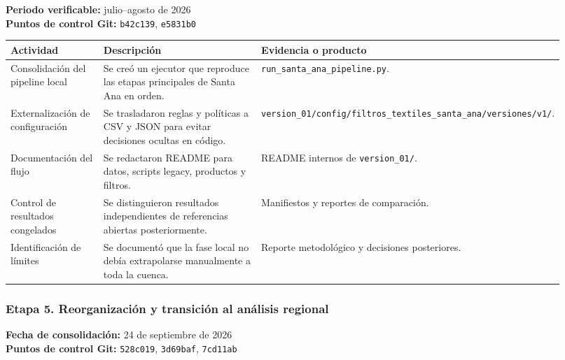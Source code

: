\documentclass[
  spanish,
]{article}
\newcounter{none} %
\begin{document}
\textbf{Periodo verificable:} julio--agosto de 2026\\
\textbf{Puntos de control Git:} \texttt{b42c139}, \texttt{e5831b0}

{\def\LTcaptype{none} %
\begin{longtable}[]{@{}p{0.20\linewidth}p{0.44\linewidth}p{0.28\linewidth}@{}}
\toprule\noalign{}
Actividad & Descripción & Evidencia o producto \\
\midrule\noalign{}
\endhead
\bottomrule\noalign{}
\endlastfoot
Consolidación del pipeline local & Se creó un ejecutor que reproduce las
etapas principales de Santa Ana en orden. &
\texttt{run\_santa\_ana\_pipeline.py}. \\
Externalización de configuración & Se trasladaron reglas y políticas a
CSV y JSON para evitar decisiones ocultas en código. &
\texttt{version\_01/config/filtros\_textiles\_santa\_ana/versiones/v1/}. \\
Documentación del flujo & Se redactaron README para datos, scripts
legacy, productos y filtros. & README internos de
\texttt{version\_01/}. \\
Control de resultados congelados & Se distinguieron resultados
independientes de referencias abiertas posteriormente. & Manifiestos y
reportes de comparación. \\
Identificación de límites & Se documentó que la fase local no debía
extrapolarse manualmente a toda la cuenca. & Reporte metodológico y
decisiones posteriores. \\
\end{longtable}
}

\subsubsection{Etapa 5. Reorganización y transición al análisis
regional}\label{etapa-5-reorganizaciuxf3n-y-transiciuxf3n-al-anuxe1lisis-regional}

\textbf{Fecha de consolidación:} 24 de septiembre de 2026\\
\textbf{Puntos de control Git:} \texttt{528c019}, \texttt{3d69baf},
\texttt{7cd11ab}
\end{document}
